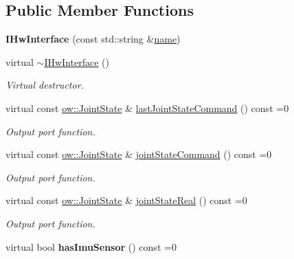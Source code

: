 \subsection*{Public Member Functions}
\begin{DoxyCompactItemize}
\item 
{\bfseries I\+Hw\+Interface} (const std\+::string \&\hyperlink{classow_1_1GenericModuleBase_a4b712883728cdbab7779e27f9a23689c}{name})\hypertarget{classow_1_1IHwInterface_a44d8add84f4159d31064d29941ac00e5}{}\label{classow_1_1IHwInterface_a44d8add84f4159d31064d29941ac00e5}

\item 
virtual \hyperlink{classow_1_1IHwInterface_a6d96b2d0bc7b5514be6e36cf598394ae}{$\sim$\+I\+Hw\+Interface} ()\hypertarget{classow_1_1IHwInterface_a6d96b2d0bc7b5514be6e36cf598394ae}{}\label{classow_1_1IHwInterface_a6d96b2d0bc7b5514be6e36cf598394ae}

\begin{DoxyCompactList}\small\item\em Virtual destructor. \end{DoxyCompactList}\item 
virtual const \hyperlink{classow__core_1_1JointState}{ow\+::\+Joint\+State} \& \hyperlink{classow_1_1IHwInterface_a935479753384efbb726e4117442c000e}{last\+Joint\+State\+Command} () const =0
\begin{DoxyCompactList}\small\item\em Output port function. \end{DoxyCompactList}\item 
virtual const \hyperlink{classow__core_1_1JointState}{ow\+::\+Joint\+State} \& \hyperlink{classow_1_1IHwInterface_aaa3997aae0564e74e42d6517dd15085d}{joint\+State\+Command} () const =0
\begin{DoxyCompactList}\small\item\em Output port function. \end{DoxyCompactList}\item 
virtual const \hyperlink{classow__core_1_1JointState}{ow\+::\+Joint\+State} \& \hyperlink{classow_1_1IHwInterface_a67a68840249d34e26e4d8421f7fa7df8}{joint\+State\+Real} () const =0
\begin{DoxyCompactList}\small\item\em Output port function. \end{DoxyCompactList}\item 
virtual bool {\bfseries has\+Imu\+Sensor} () const =0\hypertarget{classow_1_1IHwInterface_a072539c143c30ff1a09f6171f14793d1}{}\label{classow_1_1IHwInterface_a072539c143c30ff1a09f6171f14793d1}


\end{DoxyCompactItemize}
